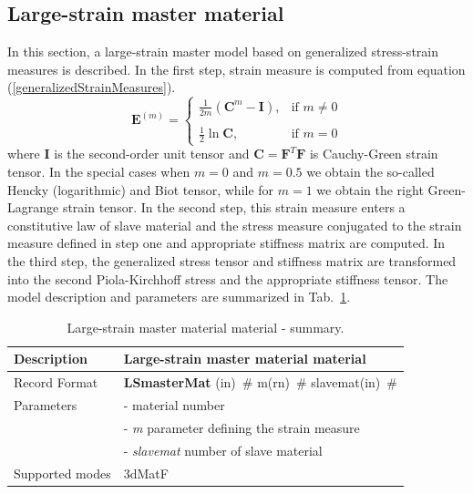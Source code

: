 \documentclass[a4paper]{article}
\newcommand{\descitem}[1]{{\noindent \bf #1}}
\newcommand{\elemparam}[2]{{{#1\tiny (#2)}~\#}}
\newcommand{\param}[1]{{\it #1}}
\newenvironment{mmt}{\begin{tabular}{|l|p{9cm}|}}{\end{tabular}\\}
\newenvironment{mmt}{\begin{tabular}{|l|l|}}{\end{tabular}\\}
\begin{document}
\subsection{Large-strain master material}
In this section, a large-strain master model based on generalized stress-strain measures is described. 
In the first step, strain measure is computed from equation (\ref{generalizedStrainMeasures}).
\begin{equation}\label{generalizedStrainMeasures}
\boldsymbol{E}^{(m)} = \begin{cases}
 \displaystyle{\frac{1}{2m}}\left(\boldsymbol{C}^m-\boldsymbol{I}\right), & \text{if }m \neq 0 \\
 \\
 \displaystyle{\frac{1}{2}}\ln\boldsymbol{C}, & \text{if }m = 0
\end{cases} 
\end{equation}
 where $\boldsymbol{I}$ is the second-order unit tensor and $\boldsymbol{C} = \boldsymbol{F}^T\boldsymbol{F}$ is Cauchy-Green strain tensor. In the special cases when $m = 0$ and $m = 0.5$ we obtain the so-called Hencky (logarithmic) and Biot tensor, while for $m = 1$ we obtain the right Green-Lagrange strain tensor.   
 In the second step, this strain measure enters a constitutive law of slave material and the stress measure conjugated to the strain measure defined in step one and appropriate stiffness matrix are computed. In the third step, the generalized stress tensor and stiffness matrix are transformed into the second Piola-Kirchhoff stress and the appropriate stiffness tensor. 
The model description and parameters are summarized in Tab.~\ref{LSmasterMat_table}.
\begin{table}[!htb]
\begin{center}
\begin{mmt}
\hline
Description & Large-strain master material material\\
\hline
Record Format & \descitem{LSmasterMat}  \elemparam{}{in}
\elemparam{m}{rn} \elemparam{slavemat}{in}\\
Parameters &- \param{} material number\\
&- \param{m} parameter defining the strain measure\\
&- \param{slavemat} number of slave material\\
Supported modes& 3dMatF\\
\hline
\end{mmt}
\caption{Large-strain master material material - summary.}
\label{LSmasterMat_table}
\end{center}
\end{table}
\end{document}
